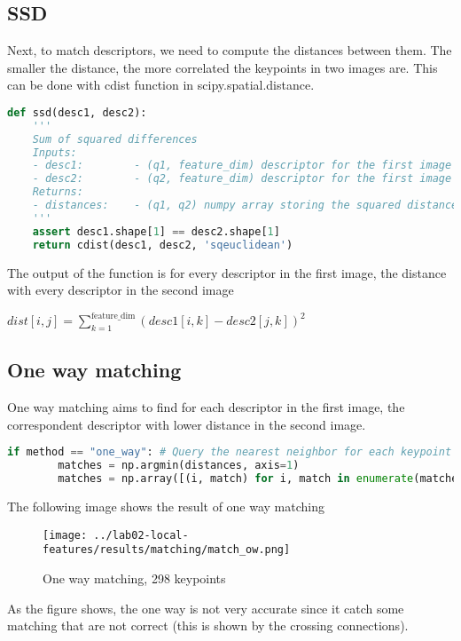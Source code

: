 \documentclass{ETHExercise}
\begin{document}
\subsection{SSD}
Next, to match descriptors, we need to compute the distances between them.
The smaller the distance, the more correlated the keypoints in two images are.
This can be done with cdist function in scipy.spatial.distance. 
\begin{lstlisting}[language=Python, caption=SSD]
def ssd(desc1, desc2):
    '''
    Sum of squared differences
    Inputs:
    - desc1:        - (q1, feature_dim) descriptor for the first image
    - desc2:        - (q2, feature_dim) descriptor for the first image
    Returns:
    - distances:    - (q1, q2) numpy array storing the squared distance
    '''
    assert desc1.shape[1] == desc2.shape[1]
    return cdist(desc1, desc2, 'sqeuclidean')
  \end{lstlisting}

  The output of the function is for every descriptor in the first image,
  the distance with every descriptor in the second image
  \begin{center}
    $dist[i,j] = \sum\limits_{k = 1}^{\text{feature\_dim}} (desc1[i, k] - desc2[j, k])^2$
  \end{center}

\subsection{One way matching}
One way matching aims to find for each descriptor in the first image, the correspondent 
descriptor with lower distance in the second image.

\begin{lstlisting}[language=Python, caption=One way matching]
  if method == "one_way": # Query the nearest neighbor for each keypoint in image 1
        matches = np.argmin(distances, axis=1)
        matches = np.array([(i, match) for i, match in enumerate(matches)])
\end{lstlisting}

The following image shows the result of one way matching

\begin{figure}[h]
  \centering
  \texttt{[image: ../lab02-local-features/results/matching/match\_ow.png]}
  \caption{One way matching, 298 keypoints}
\end{figure}

As the figure shows, the one way is not very accurate since it 
catch some matching that are not correct (this is shown by the crossing connections).
\end{document}
